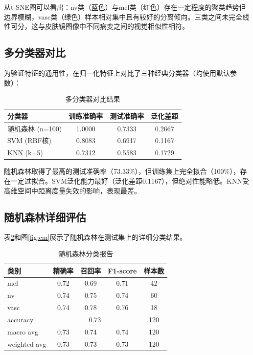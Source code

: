 \documentclass[12pt,a4paper]{ctexart}
\begin{document}
从t-SNE图可以看出：nv类（蓝色）与mel类（红色）存在一定程度的聚类趋势但边界模糊，vasc类（绿色）样本相对集中且有较好的分离倾向。三类之间未完全线性可分，这与皮肤镜图像中不同病变之间的视觉相似性相符。

\subsection{多分类器对比}

为验证特征的通用性，在归一化特征上对比了三种经典分类器（均使用默认参数）：

\begin{table}[H]
\centering
\caption{多分类器对比结果}
\label{tab:classifiers}
\begin{tabular}{lccc}
\toprule
\textbf{分类器} & \textbf{训练准确率} & \textbf{测试准确率} & \textbf{泛化差距} \\
\midrule
随机森林 (n=100) & 1.0000 & 0.7333 & 0.2667 \\
SVM (RBF核)     & 0.8083 & 0.6917 & 0.1167 \\
KNN (k=5)       & 0.7312 & 0.5583 & 0.1729 \\
\bottomrule
\end{tabular}
\end{table}

随机森林取得了最高的测试准确率（73.33\%），但训练集上完全拟合（100\%），存在一定过拟合。SVM泛化能力最好（泛化差距0.1167），但绝对性能略低。KNN受高维空间中距离度量失效的影响，表现最差。

\subsection{随机森林详细评估}

表\ref{tab:rf_report}和图\ref{fig:cm}展示了随机森林在测试集上的详细分类结果。

\begin{table}[H]
\centering
\caption{随机森林分类报告}
\label{tab:rf_report}
\begin{tabular}{lcccc}
\toprule
\textbf{类别} & \textbf{精确率} & \textbf{召回率} & \textbf{F1-score} & \textbf{样本数} \\
\midrule
mel  & 0.72 & 0.69 & 0.71 & 42 \\
nv   & 0.74 & 0.75 & 0.74 & 60 \\
vasc & 0.74 & 0.78 & 0.76 & 18 \\
\midrule
accuracy     & \multicolumn{3}{c}{0.73} & 120 \\
macro avg    & 0.73 & 0.74 & 0.74 & 120 \\
weighted avg & 0.73 & 0.73 & 0.73 & 120 \\
\bottomrule
\end{tabular}
\end{table}
\end{document}
